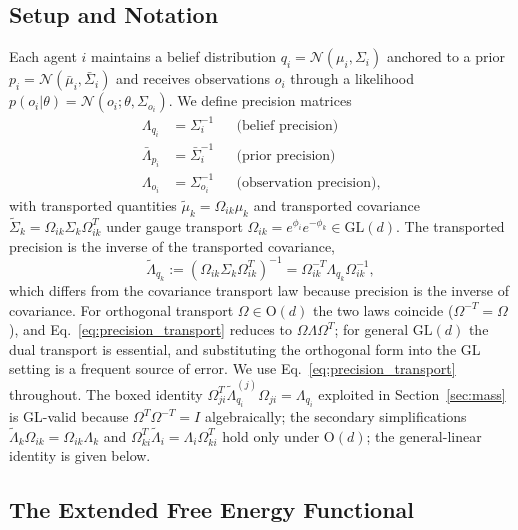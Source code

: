 \documentclass[11pt]{article}
\begin{document}
\subsection{Setup and Notation}

Each agent $i$ maintains a belief distribution $q_i = \mathcal{N}(\mu_i, \Sigma_i)$ anchored to a prior $p_i = \mathcal{N}(\bar{\mu}_i, \bar{\Sigma}_i)$ and receives observations $o_i$ through a likelihood $p(o_i | \theta) = \mathcal{N}(o_i; \theta, \Sigma_{o_i})$. We define precision matrices
\begin{align}
\Lambda_{q_i} &= \Sigma_i^{-1} & &\text{(belief precision)} \\
\bar{\Lambda}_{p_i} &= \bar{\Sigma}_i^{-1} & &\text{(prior precision)} \\
\Lambda_{o_i} &= \Sigma_{o_i}^{-1} & &\text{(observation precision)},
\end{align}
with transported quantities $\tilde{\mu}_k = \Omega_{ik}\mu_k$ and transported covariance $\tilde{\Sigma}_k = \Omega_{ik}\Sigma_k\Omega_{ik}^T$ under gauge transport $\Omega_{ik} = e^{\phi_i}e^{-\phi_k} \in \mathrm{GL}(d)$. The transported precision is the inverse of the transported covariance,
\begin{equation}
\tilde{\Lambda}_{q_k} := (\Omega_{ik}\Sigma_k\Omega_{ik}^T)^{-1} = \Omega_{ik}^{-T}\Lambda_{q_k}\Omega_{ik}^{-1},
\label{eq:precision_transport}
\end{equation}
which differs from the covariance transport law because precision is the inverse of covariance. For orthogonal transport $\Omega \in \mathrm{O}(d)$ the two laws coincide ($\Omega^{-T} = \Omega$), and Eq.~\eqref{eq:precision_transport} reduces to $\Omega\Lambda\Omega^T$; for general $\mathrm{GL}(d)$ the dual transport is essential, and substituting the orthogonal form into the GL setting is a frequent source of error. We use Eq.~\eqref{eq:precision_transport} throughout. The boxed identity $\Omega_{ji}^T \tilde{\Lambda}_{q_i}^{(j)} \Omega_{ji} = \Lambda_{q_i}$ exploited in Section~\ref{sec:mass} is GL-valid because $\Omega^T \Omega^{-T} = I$ algebraically; the secondary simplifications $\tilde{\Lambda}_k\Omega_{ik} = \Omega_{ik}\Lambda_k$ and $\Omega_{ki}^T\tilde\Lambda_i = \Lambda_i\Omega_{ki}^T$ hold only under $\mathrm{O}(d)$; the general-linear identity is given below.

\subsection{The Extended Free Energy Functional}
\end{document}
